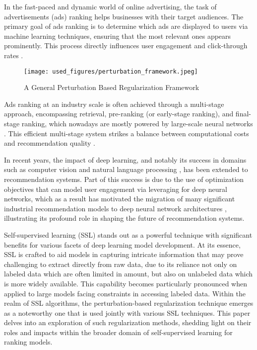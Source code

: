 In the fast-paced and dynamic world of online advertising, the task of advertisements (ads) ranking helps businesses with their target audiences. 
The primary goal of ads ranking is to determine which ads are displayed to users via machine learning techniques, ensuring that the most relevant ones appears prominently. 
This process directly influences user engagement and click-through rates \cite{introduction_3, introduction_4}. 
\begin{figure}[h]
  \centering
  \texttt{[image: used\_figures/perturbation\_framework.jpeg]}
  
  \caption{A General Perturbation Based Regularization Framework}
\label{fig:perturbation_framework}
\end{figure}

Ads ranking at an industry scale is often achieved through a multi-stage approach, encompassing retrieval, pre-ranking (or early-stage ranking), and final-stage ranking, which nowadays are mostly powered by large-scale neural networks \cite{introduction_1, introduction_2}.
This efficient multi-stage system strikes a balance between computational costs and recommendation quality \cite{int_ctr, int_ctr_2, naumov2019deep}. 

In recent years, the impact of deep learning, and notably its success in domains such as computer vision and natural language processing \cite{int_deep_learninig, int_nlp}, has been extended to recommendation systems.
Part of this success is due to the use of optimization objectives that can model user engagement via leveraging for deep neural networks, which as a result has motivated the migration of many significant industrial recommendation models to deep neural network architectures \cite{int_ctr_2, int_coll_dl}, illustrating its profound role in shaping the future of recommendation systems.

Self-supervised learning (SSL) stands out as a powerful technique with significant benefits for various facets of deep learning model development. 
At its essence, SSL is crafted to aid models in capturing intricate information that may prove challenging to extract directly from raw data, due to its reliance not only on labeled data which are often limited in amount, but also on unlabeled data which is more widely available. 
This capability becomes particularly pronounced when applied to large models facing constraints in accessing labeled data. 
Within the realm of SSL algorithms, the perturbation-based regularization technique emerges as a noteworthy one that is used jointly with various SSL techniques. 
This paper delves into an exploration of such regularization methods, shedding light on their roles and impacts within the broader domain of self-supervised learning for ranking models.

